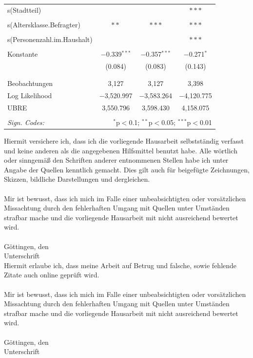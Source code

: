 \documentclass{Vorlage}
\begin{document}
\begin{appendix}
\begin{table}[h]
\begin{tabular}{@{\extracolsep{5pt}}lccc}
 s(Stadtteil) &  &  & $***$ \\ 
  & & & \\ 
 s(Altersklasse.Befragter) & $**$ & $***$  & $***$ \\ 
  & & & \\ 
 s(Personenzahl.im.Haushalt) &  &  & $***$ \\ 
  & & & \\ 
 Konstante & $-$0.339$^{***}$ & $-$0.357$^{***}$ & $-$0.271$^{*}$ \\ 
  & (0.084) & (0.083) & (0.143) \\ 
  & & & \\ 
\hline \\[-1.8ex] 
Beobachtungen & 3,127 & 3,127 & 3,398 \\ 
Log Likelihood & $-$3,520.997 & $-$3,583.264 & $-$4,120.775 \\ 
UBRE & 3,550.796 & 3,598.430 & 4,158.075 \\ 
\hline 
\hline \\[-1.8ex] 
\textit{Sign. Codes:}  & \multicolumn{3}{r}{$^{*}$p$<$0.1; $^{**}$p$<$0.05; $^{***}$p$<$0.01} \\ 
\end{tabular} 
\end{table} 

\end{appendix}
\clearpage
\pagestyle{plain}


Hiermit versichere ich, dass ich die vorliegende Hausarbeit selbstständig verfasst und keine anderen als die angegebenen
Hilfsmittel benutzt habe. Alle wörtlich oder sinngemäß den Schriften anderer entnommenen Stellen
habe ich unter Angabe der Quellen kenntlich gemacht. Dies gilt auch für beigefügte Zeichnungen, Skizzen, bildliche
Darstellungen und dergleichen.\\
\\
Mir ist bewusst, dass ich mich im Falle einer unbeabsichtigten oder vorsätzlichen Missachtung durch den fehlerhaften
Umgang mit Quellen unter Umständen strafbar mache und die vorliegende Hausarbeit mit nicht ausreichend
bewertet wird.
\\
\\Göttingen, den
\\Unterschrift
\vspace*{4cm}
\\
Hiermit erlaube ich, dass meine Arbeit auf Betrug und falsche, sowie fehlende Zitate auch online geprüft wird.\\
\\
Mir ist bewusst, dass ich mich im Falle einer unbeabsichtigten oder vorsätzlichen Missachtung durch den fehlerhaften
Umgang mit Quellen unter Umständen strafbar mache und die vorliegende Hausarbeit mit nicht ausreichend
bewertet wird.
\\
\\Göttingen, den
\\Unterschrift
\clearpage
\end{document}
